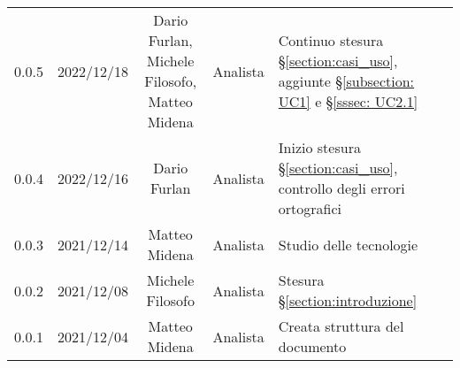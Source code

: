 \begin{center}
\begin{longtable}[c]{c | c | c | c | p{5cm}}
		0.0.5                                                      & 2022/12/18 & \shortstack{Dario Furlan,                                                                                                                          \\ Michele Filosofo,\\ Matteo Midena} & Analista & Continuo stesura §\ref{section:casi_uso}, aggiunte §\ref{subsection: UC1}  e §\ref{sssec: UC2.1}\\
		0.0.4                                                      & 2022/12/16 & Dario Furlan              & Analista     & Inizio stesura §\ref{section:casi_uso}, controllo degli errori ortografici                              \\
		0.0.3                                                      & 2021/12/14 & Matteo Midena             & Analista     & Studio delle tecnologie                                                                                 \\
		0.0.2                                                      & 2021/12/08 & Michele Filosofo          & Analista     & Stesura §\ref{section:introduzione}                                                                     \\
		0.0.1                                                      & 2021/12/04 & Matteo Midena             & Analista     & Creata struttura del documento                                                                          \\
	\end{longtable}
\end{center}